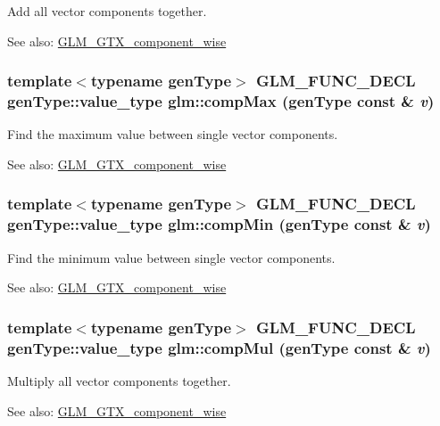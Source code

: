 Add all vector components together. \begin{Desc}
\item[See also:]\hyperlink{group__gtx__component__wise}{GLM\_\-GTX\_\-component\_\-wise} \end{Desc}
\hypertarget{group__gtx__component__wise_gc32466f4e6405b6fdefc0fdfb5db77ec}{
\subsubsection[compMax]{\setlength{\rightskip}{0pt plus 5cm}template$<$typename genType$>$ GLM\_\-FUNC\_\-DECL genType::value\_\-type glm::compMax (genType const \& {\em v})}}
\label{group__gtx__component__wise_gc32466f4e6405b6fdefc0fdfb5db77ec}


Find the maximum value between single vector components. \begin{Desc}
\item[See also:]\hyperlink{group__gtx__component__wise}{GLM\_\-GTX\_\-component\_\-wise} \end{Desc}
\hypertarget{group__gtx__component__wise_ge4f6961924637c6e9fcdcd93498d9151}{
\subsubsection[compMin]{\setlength{\rightskip}{0pt plus 5cm}template$<$typename genType$>$ GLM\_\-FUNC\_\-DECL genType::value\_\-type glm::compMin (genType const \& {\em v})}}
\label{group__gtx__component__wise_ge4f6961924637c6e9fcdcd93498d9151}


Find the minimum value between single vector components. \begin{Desc}
\item[See also:]\hyperlink{group__gtx__component__wise}{GLM\_\-GTX\_\-component\_\-wise} \end{Desc}
\hypertarget{group__gtx__component__wise_gf6ecc951daaa8d0226bb6884919ae574}{
\subsubsection[compMul]{\setlength{\rightskip}{0pt plus 5cm}template$<$typename genType$>$ GLM\_\-FUNC\_\-DECL genType::value\_\-type glm::compMul (genType const \& {\em v})}}
\label{group__gtx__component__wise_gf6ecc951daaa8d0226bb6884919ae574}


Multiply all vector components together. \begin{Desc}
\item[See also:]\hyperlink{group__gtx__component__wise}{GLM\_\-GTX\_\-component\_\-wise} \end{Desc}
